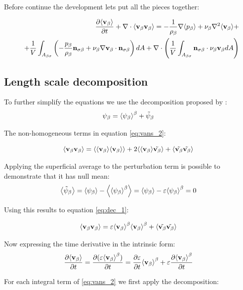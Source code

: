 Before continue the development lets put all the pieces together:

\begin{eqnarray}
&& \frac{\partial {\left< \textbf{v}_{\beta}\right>}}{\partial t} + \nabla \cdot {\left< \textbf{v}_{\beta}\textbf{v}_{\beta}\right>} = -\dfrac{1}{\rho_{\beta}} \nabla {\left< p_{\beta}\right>} + \nu_{\beta}\nabla^2 {\left< \textbf{v}_{\beta} \right>} + \nonumber \\
&& +\dfrac{1}{V} \int_{A_{\beta \sigma}} \left( -\dfrac{p_{\beta}}{\rho_{\beta}} \mathbf{n}_{\sigma \beta} + \nu_{\beta} \nabla \textbf{v}_{\beta} \cdot \mathbf{n}_{\sigma \beta} \right) dA  +  \nabla \cdot \left( \dfrac{1}{V} \int_{A_{\beta \sigma}} \mathbf{n}_{\sigma \beta} \cdot \nu_{\beta} \textbf{v}_{\beta} dA \right)
	\label{eq:vans_2}
\end{eqnarray}


\subsection{Length scale decomposition}

To further simplify the equations we use the decomposition proposed by \citet{gray1975derivation}:
\begin{equation}
\psi_{\beta} = {\left< \psi_{\beta} \right>}^{\beta} + \tilde{\psi}_{\beta}
\end{equation}

The non-homogeneous terms in equation \ref{eq:vans_2}:

\begin{equation}
{\left< \textbf{v}_{\beta}\textbf{v}_{\beta}\right>} = {\left< {\left< \textbf{v}_{\beta} \right>}{\left< \textbf{v}_{\beta} \right>} \right>} +2{\left< {\left< \textbf{v}_{\beta} \right>}\tilde{\textbf{v}_{\beta}} \right>} +{\left< \tilde{\textbf{v}_{\beta}} \tilde{\textbf{v}_{\beta}} \right>}
\label{eq:dec_1}
\end{equation}

Applying the superficial average to the perturbation term is possible to demonstrate that it has null mean:
$$
{\left< \tilde{\psi}_{\beta} \right>} = {\left< \psi_{\beta} \right>} - {\left< {\left< \psi_{\beta} \right>}^{\beta} \right>} = {\left< \psi_{\beta} \right>} -\varepsilon {\left< \psi_{\beta} \right>}^{\beta} = 0
$$

Using this results to equation \eqref{eq:dec_1}:

\begin{equation}
{\left< \textbf{v}_{\beta}\textbf{v}_{\beta}\right>} = \varepsilon {\left< \textbf{v}_{\beta}\right>}^{\beta}{\left< \textbf{v}_{\beta} \right>}^{\beta} +{\left< \tilde{\textbf{v}_{\beta}} \tilde{\textbf{v}_{\beta}} \right>}
\end{equation}

Now expressing the time derivative in the intrinsic form:
$$
\frac{\partial {\left< \textbf{v}_{\beta}\right>}}{\partial t} = \frac{\partial (\varepsilon{\left< \textbf{v}_{\beta}\right>}^{\beta})}{\partial t} = \frac{\partial \varepsilon}{\partial t}{\left< \textbf{v}_{\beta} \right>}^{\beta} + \varepsilon \frac{\partial {\left< \textbf{v}_{\beta}\right>}^{\beta}}{\partial t}
$$

For each integral term of \ref{eq:vans_2} we first apply the decomposition:


